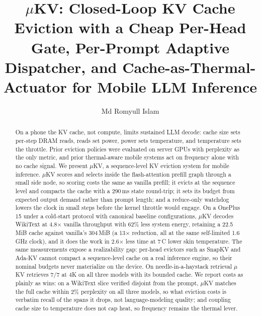 \documentclass[sigconf, anonymous=false, screen=true]{acmart}
\begin{document}
\title[$\mu$KV: Closed-Loop KV Cache Eviction for Mobile LLM Inference]{$\mu$KV: Closed-Loop KV Cache Eviction with a Cheap Per-Head Gate, Per-Prompt Adaptive Dispatcher, and Cache-as-Thermal-Actuator for Mobile LLM Inference}

\author{Md Romyull Islam}

\begin{abstract}
On a phone the KV cache, not compute, limits sustained LLM decode: cache size sets per-step DRAM reads, reads set power, power sets temperature, and temperature sets the throttle. Prior eviction policies were evaluated on server GPUs with perplexity as the only metric, and prior thermal-aware mobile systems act on frequency alone with no cache signal. We present $\mu$KV, a sequence-level KV eviction system for mobile inference. $\mu$KV scores and selects inside the flash-attention prefill graph through a small side node, so scoring costs the same as vanilla prefill; it evicts at the sequence level and compacts the cache with a 290\,ms state round-trip; it sets its budget from expected output demand rather than prompt length; and a reduce-only watchdog lowers the clock in small steps before the kernel throttle would engage. On a OnePlus 15 under a cold-start protocol with canonical baseline configurations, $\mu$KV decodes WikiText at 4.8$\times$ vanilla throughput with 62\% less system energy, retaining a 22.5\,MiB cache against vanilla's 304\,MiB (a 13$\times$ reduction, all at the same self-limited 1.6\,GHz clock), and it does the work in 2.6$\times$ less time at 7\,\textdegree C lower skin temperature. The same measurements expose a realizability gap: per-head evictors such as SnapKV and Ada-KV cannot compact a sequence-level cache on a real inference engine, so their nominal budgets never materialize on the device. On needle-in-a-haystack retrieval $\mu$KV retrieves 7/7 at 4K on all three models with its bounded cache. We report costs as plainly as wins: on a WikiText slice verified disjoint from the prompt, $\mu$KV matches the full cache within 2\% perplexity on all three models, so what eviction costs is verbatim recall of the spans it drops, not language-modeling quality; and coupling cache size to temperature does not cap heat, so frequency remains the thermal lever.
\end{abstract}
\end{document}
